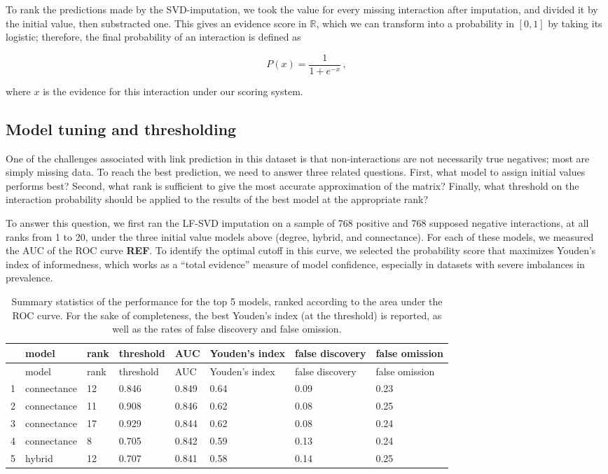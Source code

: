 \documentclass[10pt,oneside]{article}
\begin{document}
To rank the predictions made by the SVD-imputation, we took the value
for every missing interaction after imputation, and divided it by the
initial value, then substracted one. This gives an evidence score in
\(\mathbb{R}\), which we can transform into a probability in \([0,1]\)
by taking its logistic; therefore, the final probability of an
interaction is defined as

\[
P(x) = \frac{1}{1+e^{-x}}\,,
\]

where \(x\) is the evidence for this interaction under our scoring
system.

\hypertarget{model-tuning-and-thresholding}{%
\subsection{Model tuning and
thresholding}\label{model-tuning-and-thresholding}}

One of the challenges associated with link prediction in this dataset is
that non-interactions are not necessarily true negatives; most are
simply missing data. To reach the best prediction, we need to answer
three related questions. First, what model to assign initial values
performs best? Second, what rank is sufficient to give the most accurate
approximation of the matrix? Finally, what threshold on the interaction
probability should be applied to the results of the best model at the
appropriate rank?

To answer this question, we first ran the LF-SVD imputation on a sample
of 768 positive and 768 supposed negative interactions, at all ranks
from 1 to 20, under the three initial value models above (degree,
hybrid, and connectance). For each of these models, we measured the AUC
of the ROC curve \textbf{REF}. To identify the optimal cutoff in this
curve, we selected the probability score that maximizes Youden's index
of informedness, which works as a ``total evidence'' measure of model
confidence, especially in datasets with severe imbalances in prevalence.

\hypertarget{tbl:modelselection}{}
\begin{longtable}[]{@{}llllllll@{}}
\caption{\label{tbl:modelselection}Summary statistics of the performance
for the top 5 models, ranked according to the area under the ROC curve.
For the sake of completeness, the best Youden's index (at the threshold)
is reported, as well as the rates of false discovery and false
omission.}\tabularnewline
\toprule
& model & rank & threshold & AUC & Youden's index & false discovery &
false omission\tabularnewline
\midrule
\endfirsthead
\toprule
& model & rank & threshold & AUC & Youden's index & false discovery &
false omission\tabularnewline
\midrule
\endhead
1 & connectance & 12 & 0.846 & 0.849 & 0.64 & 0.09 & 0.23\tabularnewline
2 & connectance & 11 & 0.908 & 0.846 & 0.62 & 0.08 & 0.25\tabularnewline
3 & connectance & 17 & 0.929 & 0.844 & 0.62 & 0.08 & 0.24\tabularnewline
4 & connectance & 8 & 0.705 & 0.842 & 0.59 & 0.13 & 0.24\tabularnewline
5 & hybrid & 12 & 0.707 & 0.841 & 0.58 & 0.14 & 0.25\tabularnewline
\bottomrule
\end{longtable}
\end{document}
